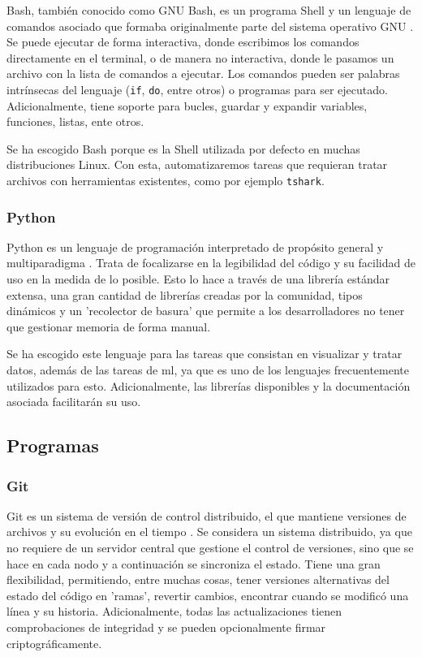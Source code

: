 \color{blue} %

Bash, también conocido como GNU Bash, es un programa Shell y un lenguaje de comandos asociado que formaba originalmente parte del sistema operativo GNU \cite{gnubashweb} \cite{gnubashmanual}. Se puede ejecutar de forma interactiva, donde escribimos los comandos directamente en el terminal, o de manera no interactiva, donde le pasamos un archivo con la lista de comandos a ejecutar. Los comandos pueden ser palabras intrínsecas del lenguaje (\texttt{if}, \texttt{do}, entre otros) o programas para ser ejecutado. Adicionalmente, tiene soporte para bucles, guardar y expandir variables, funciones, listas, ente otros.

Se ha escogido Bash porque es la Shell utilizada por defecto en muchas distribuciones Linux. Con esta, automatizaremos tareas que requieran tratar archivos con herramientas existentes, como por ejemplo \texttt{tshark}.

\subsubsection{Python}

Python es un lenguaje de programación interpretado de propósito general y multiparadigma \cite{aboutpython} \cite{davepython}. Trata de focalizarse en la legibilidad del código y su facilidad de uso en la medida de lo posible. Esto lo hace a través de una librería estándar extensa, una gran cantidad de librerías creadas por la comunidad, tipos dinámicos y un 'recolector de basura' que permite a los desarrolladores no tener que gestionar memoria de forma manual.

Se ha escogido este lenguaje para las tareas que consistan en visualizar y tratar datos, además de las tareas de \gls{ml}, ya que es uno de los lenguajes frecuentemente utilizados para esto. Adicionalmente, las librerías disponibles y la documentación asociada facilitarán su uso.

\subsection{Programas}

\subsubsection{Git}

Git es un sistema de versión de control distribuido, el que mantiene versiones de archivos y su evolución en el tiempo \cite{chacon2014pro}. Se considera un sistema distribuido, ya que no requiere de un servidor central que gestione el control de versiones, sino que se hace en cada nodo y a continuación se sincroniza el estado. Tiene una gran flexibilidad, permitiendo, entre muchas cosas, tener versiones alternativas del estado del código en 'ramas', revertir cambios, encontrar cuando se modificó una línea y su historia. Adicionalmente, todas las actualizaciones tienen comprobaciones de integridad y se pueden opcionalmente firmar criptográficamente.

